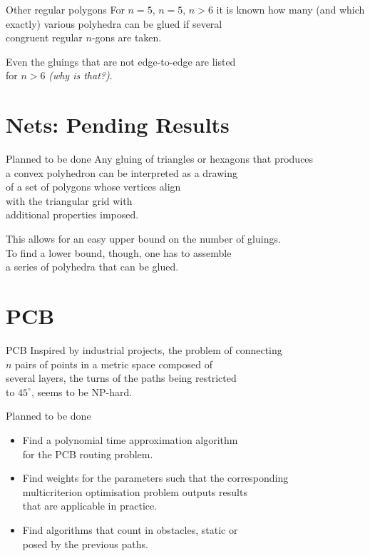\documentclass[12pt,aspectratio=169,svgnames]{beamer}
\begin{document}
\begin{frame}{Other regular polygons}
	For \(n=5\), \(n=5\), \(n>6\) it is known how many (and which \\
	exactly) various polyhedra can be glued if several \\
	congruent regular \(n\)-gons are taken. \bigskip

	Even the gluings that are not edge-to-edge are listed \\
	for \(n>6\) {\it (why is that?)}.
\end{frame}

\section{Nets: Pending Results}

\begin{frame}{Planned to be done}
	Any gluing of triangles or hexagons that produces \\
	a convex polyhedron can be interpreted as a drawing \\
	of a set of polygons whose vertices align \\
	with the triangular grid with \\
	additional properties imposed. \bigskip

	This allows for an easy upper bound on the number of gluings. \\
	To find a lower bound, though, one has to assemble \\
	a series of polyhedra that can be glued.
\end{frame}

\section{PCB}

\begin{frame}{PCB}
	Inspired by industrial projects, the problem of connecting \\
	\(n\) pairs of points in a metric space composed of \\
	several layers, the turns of the paths being restricted \\
	to \(45^\circ\), seems to be NP-hard.
\end{frame}

\begin{frame}{Planned to be done}
\begin{itemize}
	\item Find a polynomial time approximation algorithm \\
		for the PCB routing problem.
	\item Find weights for the parameters such that the corresponding \\
		multicriterion optimisation problem outputs results \\
		that are applicable in practice.
	\item Find algorithms that count in obstacles, static or \\
	posed by the previous paths.
\end{itemize}
\end{frame}
\end{document}

